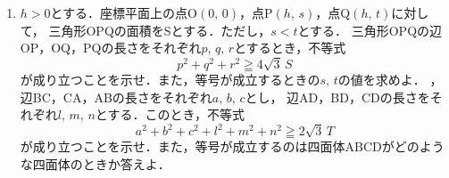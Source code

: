 \documentclass[../../main.tex]{subfiles}
\begin{document}
\begin{enumerate}
  \item$h>0$とする．座標平面上の点O$(0, \, 0)$，点P$(h, \, s)$，点Q$(h, \, t)$に対して，
    三角形OPQの面積をSとする．ただし，$s<t$とする．
    三角形OPQの辺OP，OQ，PQの長さをそれぞれ$p, \, q, \, r$とするとき，不等式
    \[ p^2+q^2+r^2\geqq4\sqrt3 \, S \]
    が成り立つことを示せ．また，等号が成立するときの$s, \, t$の値を求めよ．
  ，辺BC，CA，ABの長さをそれぞれ$a, \, b, \, c$とし，
    辺AD，BD，CDの長さをそれぞれ$l, \, m, \, n$とする．このとき，不等式
    \[  a^2+b^2+c^2+l^2+m^2+n^2\geqq2\sqrt3 \, T \]
    が成り立つことを示せ．また，等号が成立するのは四面体ABCDがどのような四面体のときか答えよ．
\end{enumerate}
\end{document}
